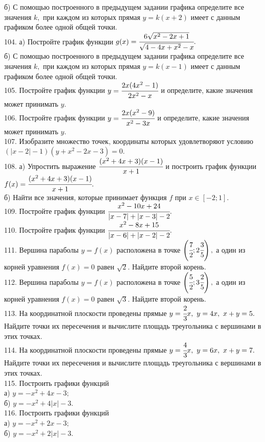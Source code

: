 б) С помощью построенного в предыдущем задании графика определите все значения $k,$ при каждом из которых прямая $y=k(x+2)$ имеет с данным графиком более одной общей точки.\\
104. а) Постройте график функции $g(x)=\cfrac{6\sqrt{x^2-2x+1}}{\sqrt{4-4x+x^2}-x}.$\\
б) С помощью построенного в предыдущем задании графика определите все значения $k,$ при каждом из которых прямая $y=k(x-1)$ имеет с данным графиком более одной общей точки.\\
105. Постройте график функции $y=\cfrac{2x(4x^2-1)}{2x^2-x}$ и определите, какие значения может принимать $y.$\\
106. Постройте график функции $y=\cfrac{2x(x^2-9)}{x^2-3x}$ и определите, какие значения может принимать $y.$\\
107. Изобразите множество точек, координаты которых удовлетворяют условию $(|x-2|-1)(y+x^2-2x-3)=0.$\\
108. а) Упростить выражение $\cfrac{(x^2+4x+3)(x-1)}{x+1}$ и построить график функции \\$f(x)=\cfrac{(x^2+4x+3)(x-1)}{x+1}.$\\
б) Найти все значения, которые принимает функция $f$ при $x\in[-2;1].$\\
109. Постройте график функции $\cfrac{x^2-10x+24}{|x-7|+|x-3|-2}.$\\
110. Постройте график функции $\cfrac{x^2-8x+15}{|x-6|+|x-2|-2}.$\\
111. Вершина параболы $y=f(x)$ расположена в точке $\left(\cfrac{7}{2};2\cfrac{3}{5}\right),$ а один из корней уравнения $f(x)=0$
равен $\sqrt{2}.$ Найдите второй корень.\\
112. Вершина параболы $y=f(x)$ расположена в точке $\left(\cfrac{5}{2};3\cfrac{2}{5}\right),$ а один из корней уравнения $f(x)=0$
равен $\sqrt{3}.$ Найдите второй корень.\\
113. На координатной плоскости проведены прямые $y=\cfrac{2}{3}x,\ y=4x,\ x+y=5.$ Найдите точки их пересечения и вычислите площадь треугольника
с вершинами в этих точках.\\
114. На координатной плоскости проведены прямые $y=\cfrac{4}{3}x,\ y=6x,\ x+y=7.$ Найдите точки их пересечения и вычислите площадь треугольника
с вершинами в этих точках.\\
115. Построить графики функций\\
а) $y=-x^2+4x-3;$\\
б) $y=-x^2+4|x|-3.$\\
116. Построить графики функций\\
а) $y=-x^2+2x-3;$\\
б) $y=-x^2+2|x|-3.$
\newpage
